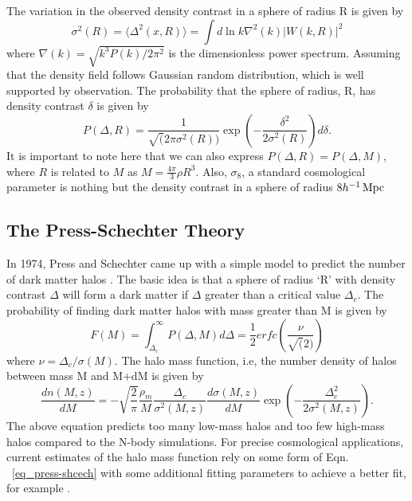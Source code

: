The variation in the observed density contrast in a sphere of radius R is given by
\begin{equation}
\sigma^{2}(R) = \langle \Delta^{2}(x,R) \rangle = \int d \ln k \nabla^{2}(k) |W(k,R)|^{2}
\end{equation}
where $\nabla(k) = \sqrt{k^{3}P(k)/2\pi^{2}}$ is the dimensionless power spectrum.
Assuming that the density field follows Gaussian random distribution, which is well supported by observation. The probability that the sphere of radius, R, has density contrast $\delta$ is given by
\begin{equation}
P(\Delta, R) = \frac{1}{\sqrt(2 \pi \sigma^{2}(R))} \exp \left(-\frac{\delta^{2}}{2\sigma^{2}(R)}\right) d\delta.
\end{equation}
It is important to note here that we can also express $P(\Delta, R) = P(\Delta, M)$, where $R$ is related to $M$ as $M = \frac{4\pi}{3} \rho R^{3}$. Also, $\sigma_{8}$, a standard cosmological parameter is nothing but the density contrast in a sphere of radius $8h^{-1} \, {\rm Mpc}$%

\subsection{The Press-Schechter Theory}
\label{halo-theory}
In 1974, Press and Schechter came up with a simple model to predict the number of dark matter halos \citep{press74}. The basic idea is that a sphere of radius `R' with density contrast $\Delta$ will form a dark matter if $\Delta$ greater than a critical value $\Delta_{c}$. The probability of finding dark matter halos with mass greater than M is given by
\begin{equation}
F(M) = \int^{\infty}_{\Delta_{c}} P(\Delta, M) d\Delta = \frac{1}{2} erfc \left(\frac{\nu}{\sqrt(	2)}\right)
\end{equation}
where $\nu = \Delta_{c}/ \sigma(M)$. The halo mass function, i.e, the number density of halos between mass M and M+dM is given by 
\begin{equation}
\frac{dn(M,z)}{dM} = -\sqrt{\frac{2}{\pi}} \frac{\rho_{m}}{M} \frac{\Delta_{c}}{\sigma^{2}(M,z)} \frac{d\sigma(M,z)}{dM}  \exp\left(-\frac{\Delta^{2}_{c}}{2 \sigma^{2}(M,z)}\right).
\label{eq_press-shcech}
\end{equation}
The above equation predicts too many low-mass halos and too few high-mass halos compared to the N-body simulations. 
For precise cosmological applications, current estimates of the halo mass function rely on some form of Eqn. ~\ref{eq_press-shcech} with some additional fitting parameters to achieve a better fit, for example \cite{tinker08, jenkins01}. 
